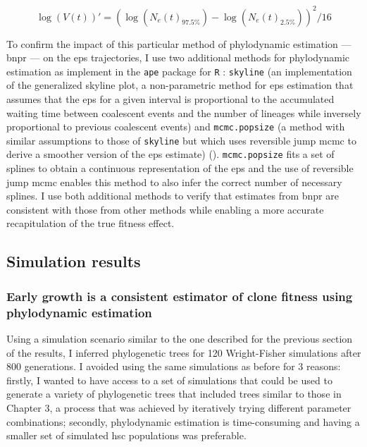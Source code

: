 \begin{equation}\label{eq:var-bnpr}
	\log(V(t))' = (\log(N_e(t)_{97.5\%}) - \log(N_e(t)_{2.5\%}))^2/16
\end{equation}

To confirm the impact of this particular method of phylodynamic estimation --- \ac{bnpr} --- on the \ac{eps} trajectories, I use two additional methods for phylodynamic estimation as implement in the \texttt{ape} package for \texttt{R} \cite{Paradis2019-na}: \texttt{skyline} (an implementation of the generalized skyline plot, a non-parametric method for \ac{eps} estimation that assumes that the \ac{eps} for a given interval is proportional to the accumulated waiting time between coalescent events and the number of lineages while inversely proportional to previous coalescent events) and \texttt{mcmc.popsize} (a method with similar assumptions to those of \texttt{skyline} but which uses reversible jump \ac{mcmc} to derive a smoother version of the \ac{eps} estimate) \cite{Opgen-Rhein2005-pi} (). \texttt{mcmc.popsize} fits a set of splines to obtain a continuous representation of the \ac{eps} and the use of reversible jump \ac{mcmc} enables this method to also infer the correct number of necessary splines. I use both additional methods to verify that estimates from \ac{bnpr} are consistent with those from other methods while enabling a more accurate recapitulation of the true fitness effect.

\begin{figure}[!ht]
	\label{fig:examples-phylo-traj}
\end{figure}

\subsection{Simulation results}

\subsubsection{Early growth is a consistent estimator of clone fitness using phylodynamic estimation}

Using a simulation scenario similar to the one described for the previous section of the results, I inferred phylogenetic trees for 120 Wright-Fisher simulations after 800 generations. I avoided using the same simulations as before for 3 reasons: firstly, I wanted to have access to a set of simulations that could be used to generate a variety of phylogenetic trees that included trees similar to those in Chapter 3, a process that was achieved by iteratively trying different parameter combinations; secondly, phylodynamic estimation is time-consuming and having a smaller set of simulated \ac{hsc} populations was preferable.

